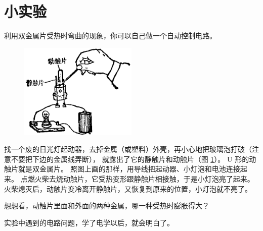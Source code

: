 \section*{小实验}

利用双金属片受热时弯曲的现象，你可以自己做一个自动控制电路。

\begin{figure}[htbp]
    \centering
    \includegraphics[width=0.5\textwidth]{../pic/czwl2-ch2-8}
    \caption{}\label{fig:2-8}
\end{figure}

找一个废的日光灯起动器，去掉金属（或塑料）外壳，再小心地把玻璃泡打破（注意不要把下边的金属线弄断），
就露出了它的静触片和动触片（图 \ref{fig:2-8}）。 U 形的动触片就是双金属片。
照图上画的那样，用导线把起动器、小灯泡和电池连接起来。
点燃火柴去烧动触片，它受热变形跟静触片相接触，于是小灯泡亮了起来。
火柴熄灭后，动触片变冷离开静触片，又恢复到原来的位置，小灯泡就不亮了。

想想看，动触片里面和外面的两种金属，哪一种受热时膨胀得大？

实验中遇到的电路问题，学了电学以后，就会明白了。


